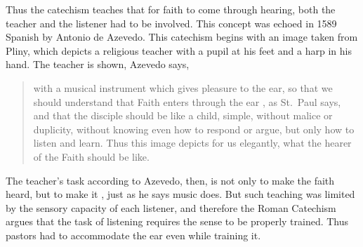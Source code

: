 Thus the catechism teaches that for faith to come through hearing, both the teacher and the listener had to be involved.
This concept was echoed in 1589 Spanish  by Antonio de Azevedo.%
  \Autocite{Azevedo:Catecismo}
This catechism begins with an image taken from Pliny, which depicts a religious teacher with a pupil at his feet and a harp in his hand.
The teacher is shown, Azevedo says,
\begin{quote}
    with a musical instrument which gives pleasure to the ear, so that we should understand that Faith enters through the ear , as St.\ Paul says, and that the disciple should be like a child, simple, without malice or duplicity, without knowing even how to respond or argue, but only how to listen and learn.
    Thus this image depicts for us elegantly, what the hearer of the Faith should be like.%
        \Autocite
        [f.~1b: 
        ]
        {Azevedo:Catecismo}
\end{quote}

The teacher's task according to Azevedo, then, is not only to make the faith heard, but to make it , just as he says music does.
But such teaching was limited by the sensory capacity of each listener, and therefore the Roman Catechism argues that the task of listening requires the sense to be properly trained.
Thus pastors had to accommodate the ear even while training it.


